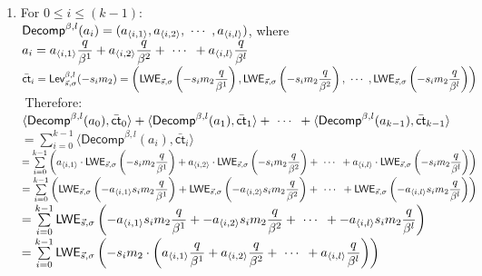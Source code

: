 \begin{enumerate}
\item For $0 \leq i \leq (k - 1)$: \\
$\textsf{Decomp}^{\beta, l}(a_i) = (a_{\langle i, 1 \rangle}, a_{\langle i, 2 \rangle}, \text{ } \text{$\cdots$} \text{ }, a_{\langle i, l \rangle})$, where $a_i = a_{\langle i, 1 \rangle}\dfrac{q}{\beta^1} + a_{\langle i, 2 \rangle}\dfrac{q}{\beta^2} + \text{ } \text{$\cdots$} \text{ } + a_{\langle i, l \rangle}\dfrac{q}{\beta^l}$ \\
$\bar{\textsf{ct}}_i =  \textsf{Lev}_{\vec{s}, \sigma}^{\beta, l}(-s_im_2) = \left(\textsf{LWE}_{\vec{s}, \sigma}\left(-s_im_2\dfrac{q}{\beta^1}\right), \textsf{LWE}_{\vec{s}, \sigma}\left(-s_im_2\dfrac{q}{\beta^2}\right), \text{ } \text{$\cdots$} \text{ }, \textsf{LWE}_{\vec{s}, \sigma}\left(-s_im_2\dfrac{q}{\beta^l}\right) \right)$ \\

$ $
Therefore: \\
$\langle \textsf{Decomp}^{\beta, l}(a_0), \bar{\textsf{ct}}_0 \rangle + \langle \textsf{Decomp}^{\beta, l}(a_1), \bar{\textsf{ct}}_1 \rangle + \text{ } \text{$\cdots$} \text{ } + \langle \textsf{Decomp}^{\beta, l}(a_{k-1}), \bar{\textsf{ct}}_{k-1} \rangle$ \\
$= \sum\limits_{i=0}^{k-1}\langle \textsf{Decomp}^{\beta, l}(a_i), \bar{\textsf{ct}}_i \rangle$ \\
$= \sum\limits_{i=0}^{k-1}\left(a_{\langle i, 1\rangle} \cdot \textsf{LWE}_{\vec{s}, \sigma}\left(-s_im_2\dfrac{q}{\beta^1}\right) + a_{\langle i, 2\rangle} \cdot \textsf{LWE}_{\vec{s}, \sigma}\left(-s_im_2\dfrac{q}{\beta^2}\right) + \text{ } \text{$\cdots$} \text{ } + a_{\langle i, l\rangle} \cdot \textsf{LWE}_{\vec{s}, \sigma}\left(-s_im_2\dfrac{q}{\beta^l}\right)\right)$ \\
$= \sum\limits_{i=0}^{k-1}\left(\textsf{LWE}_{\vec{s}, \sigma}\left(-a_{\langle i, 1\rangle}s_im_2\dfrac{q}{\beta^1}\right) + \textsf{LWE}_{\vec{s}, \sigma}\left(-a_{\langle i, 2\rangle}s_im_2\dfrac{q}{\beta^2}\right) + \text{ } \text{$\cdots$} \text{ } + \textsf{LWE}_{\vec{s}, \sigma}\left(-a_{\langle i, l\rangle}s_im_2\dfrac{q}{\beta^l}\right)\right)$ \\
$= \sum\limits_{i=0}^{k-1}\textsf{LWE}_{\vec{s}, \sigma}\left(-a_{\langle i, 1\rangle}s_im_2\dfrac{q}{\beta^1} + -a_{\langle i, 2\rangle}s_im_2\dfrac{q}{\beta^2} + \text{ } \text{$\cdots$} \text{ } + -a_{\langle i, l\rangle}s_im_2\dfrac{q}{\beta^l}\right)$ \\
$= \sum\limits_{i=0}^{k-1}\textsf{LWE}_{\vec{s}, \sigma}\left(-s_im_2 \cdot \left(a_{\langle i, 1\rangle}\dfrac{q}{\beta^1} + a_{\langle i, 2\rangle}\dfrac{q}{\beta^2} + \text{ } \text{$\cdots$} \text{ } + a_{\langle i, l\rangle}\dfrac{q}{\beta^l}\right)\right)$ \\

\end{enumerate}
